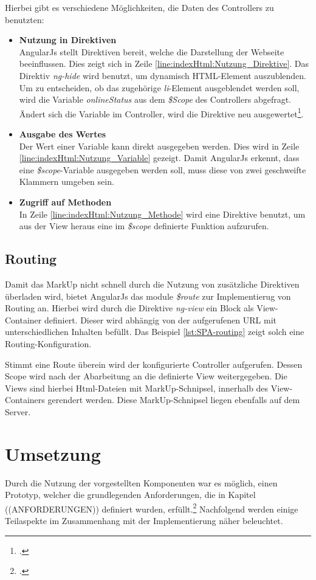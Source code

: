 Hierbei gibt es verschiedene Möglichkeiten, die Daten des Controllers zu benutzten: 
\begin{itemize}
\item \textbf{Nutzung in Direktiven}\\
AngularJs stellt Direktiven bereit, welche die Darstellung der Webseite beeinflussen. Dies zeigt sich in Zeile \ref{line:indexHtml:Nutzung_Direktive}. Das Direktiv \textit{ng-hide} wird benutzt, um dynamisch HTML-Element auszublenden. Um zu entscheiden, ob das zugehörige \textit{li}-Element ausgeblendet werden soll, wird die Variable \textit{onlineStatus} aus dem \textit{\$Scope} des Controllers abgefragt. Ändert sich die Variable im Controller, wird die Direktive neu ausgewertet\footcite{online:angular:diretive}.
\item \textbf{Ausgabe des Wertes}\\
Der Wert einer Variable kann direkt ausgegeben werden. Dies wird in Zeile \ref{line:indexHtml:Nutzung_Variable} gezeigt. Damit AngularJs erkennt, dass eine \textit{\$scope}-Variable ausgegeben werden soll, muss diese von zwei geschweifte Klammern umgeben sein.
\item \textbf{Zugriff auf Methoden}\\
In Zeile \ref{line:indexHtml:Nutzung_Methode} wird eine Direktive benutzt, um aus der View heraus eine im \textit{\$scope} definierte Funktion aufzurufen.
\end{itemize}
\subsection{Routing}
\label{ssec:SPA-Routing}
Damit das MarkUp nicht schnell durch die Nutzung von zusätzliche Direktiven überladen wird, bietet AngularJs das module \textit{\$route} zur Implementierug von Routing an. Hierbei wird durch die Direktive \textit{ng-view} ein Block als View-Container definiert. Dieser wird abhängig von der aufgerufenen URL mit unterschiedlichen Inhalten befüllt. Das Beispiel \ref{lst:SPA-routing} zeigt solch eine Routing-Konfiguration. 

Stimmt eine Route überein wird der konfigurierte Controller aufgerufen. Dessen Scope wird nach der Abarbeitung an die definierte View weitergegeben. Die Views sind hierbei Html-Dateien mit MarkUp-Schnipsel, innerhalb des View-Containers gerendert werden. Diese MarkUp-Schnipsel liegen ebenfalls auf dem Server. 
\section{Umsetzung}
\label{sec:SPA-Umsetzung}
Durch die Nutzung der vorgestellten Komponenten war es möglich, einen Prototyp, welcher die grundlegenden Anforderungen, die in Kapitel ((ANFORDERUNGEN)) definiert wurden, erfüllt.\footcite{online:Created_SPA} Nachfolgend werden einige Teilaspekte im Zusammenhang mit der Implementierung näher beleuchtet.
